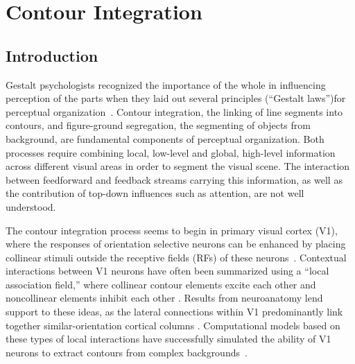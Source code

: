 \chapter{Contour Integration}
\label{sec:contour}

\section{Introduction}
\label{intro}
Gestalt psychologists recognized the importance of the whole in influencing perception of the parts when they laid out several principles (``Gestalt laws'')for perceptual organization~\citep{Wertheimer23,Koffka35}. Contour integration, the linking of line segments into contours, and figure-ground segregation, the segmenting of objects from background, are fundamental components of perceptual organization. Both processes require combining local, low-level and global, high-level information across different visual areas in order to segment the visual scene. The interaction between feedforward and feedback streams carrying this information, as well as the contribution of top-down influences such as attention, are not well understood.

The contour integration process seems to begin in primary visual cortex (V1), where the responses of orientation selective neurons can be enhanced by placing collinear stimuli outside the receptive fields (RFs) of these neurons~\citep{Stemmler_etal95a,Polat_etal98}. Contextual interactions between V1 neurons have often been summarized using a ``local association field,'' where collinear contour elements excite each other and noncollinear elements inhibit each other \citep{Ullman92, Field_etal93}. Results from neuroanatomy lend support to these ideas, as the lateral connections within V1 predominantly link together similar-orientation cortical columns \citep{Gilbert_Wiesel89,Bosking_etal97,
  Stettler_etal02}. Computational models based on these types of
local interactions have successfully simulated the ability of V1
neurons to extract contours from complex backgrounds~\citep{Li98,Yen_Finkel98,Piech_etal13}. 

